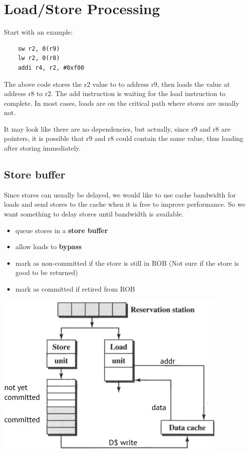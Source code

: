 \documentclass[letterpaper,12pt]{article}
\begin{document}
\section{Load/Store Processing}
Start with an example:
\begin{lstlisting}
    sw r2, 0(r9)
    lw r2, 0(r8)
    addi r4, r2, #0xf00
\end{lstlisting}
The above code stores the r2 value to to address r9, then loads the value at address r8 to r2. The add instruction is waiting for the load instruction to complete. In most cases, loads are on the critical path where stores are usually not.

It may look like there are no dependencies, but actually, since r9 and r8 are pointers, it is possible that r9 and r8 could contain the same value, thus loading after storing immediately.

\subsection{Store buffer}
Since stores can usually be delayed, we would like to use cache bandwidth for loads and send stores to the cache when it is free to improve performance. So we want something to delay stores until bandwidth is available.
\begin{itemize}
    \item queue stores in a \textbf{store buffer}
    \item allow loads to \textbf{bypass}
    \item mark as non-committed if the store is still in ROB (Not sure if the store is good to be returned)
    \item mark as committed if retired from ROB
\end{itemize}

\includegraphics*[scale = 0.7]{./Image/Store buffer.jpg}
\end{document}
